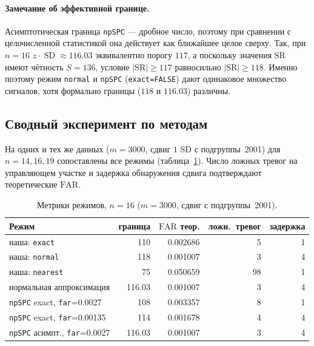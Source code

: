 \documentclass[11pt,a4paper]{article}
\newcommand{\SR}{\mathrm{SR}}
\newcommand{\FAR}{\mathrm{FAR}}
\newcommand{\SD}{\operatorname{SD}}
\begin{document}
\paragraph{Замечание об эффективной границе.} Асимптотическая граница
\texttt{npSPC} --- дробное число, поэтому при сравнении с целочисленной
статистикой она действует как ближайшее целое сверху. Так, при $n=16$
$z\cdot\SD\approx116.03$ эквивалентно порогу $117$, а поскольку значения
$\SR$ имеют чётность $S=136$, условие $|\SR|\ge117$ равносильно
$|\SR|\ge118$. Именно поэтому режим \texttt{normal} и
\texttt{npSPC} (\texttt{exact=FALSE}) дают одинаковое множество сигналов,
хотя формально границы ($118$ и $116.03$) различны.

\subsection{Сводный эксперимент по методам}
\label{sec:modes}

На одних и тех же данных ($m=3000$, сдвиг $1$ SD с подгруппы~2001) для
$n=14,16,19$ сопоставлены все режимы (таблица~\ref{tab:modes-exp}). Число
ложных тревог на управляющем участке и задержка обнаружения сдвига
подтверждают теоретические $\FAR$.

\begin{table}[htbp]\centering
\caption{Метрики режимов, $n=16$ ($m=3000$, сдвиг с подгруппы~2001).}
\label{tab:modes-exp}
\small
\begin{tabular}{@{}l r r r r@{}}
\toprule
Режим & граница & $\FAR$ теор. & ложн.\ тревог & задержка \\
\midrule
наша: \texttt{exact} & 110 & 0.002686 & 5 & 1 \\
наша: \texttt{normal} & 118 & 0.001007 & 3 & 4 \\
наша: \texttt{nearest} & 75 & 0.050659 & 98 & 1 \\
нормальная аппроксимация & 116.03 & 0.001007 & 3 & 4 \\
\texttt{npSPC} exact, \texttt{far}=0.0027 & 108 & 0.003357 & 8 & 1 \\
\texttt{npSPC} exact, \texttt{far}=0.00135 & 114 & 0.001678 & 4 & 4 \\
\texttt{npSPC} асимпт., \texttt{far}=0.0027 & 116.03 & 0.001007 & 3 & 4 \\
\bottomrule
\end{tabular}
\normalsize
\end{table}
\end{document}
